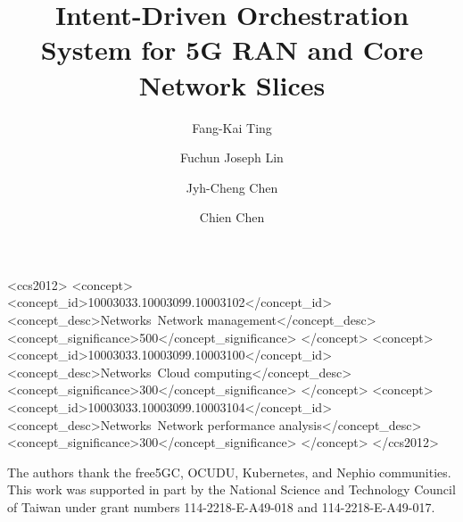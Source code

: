 ﻿\documentclass[sigconf]{acmart}
\begin{document}
\title[Intent-Driven Orchestration for 5G Slices]{Intent-Driven Orchestration System for 5G RAN and Core Network Slices}

\author{Fang-Kai Ting}

\author{Fuchun Joseph Lin}

\author{Jyh-Cheng Chen}

\author{Chien Chen}

\renewcommand{\shortauthors}{Ting and Chen}

\begin{abstract}

\end{abstract}

\begin{CCSXML}
<ccs2012>
 <concept>
  <concept_id>10003033.10003099.10003102</concept_id>
  <concept_desc>Networks~Network management</concept_desc>
  <concept_significance>500</concept_significance>
 </concept>
 <concept>
  <concept_id>10003033.10003099.10003100</concept_id>
  <concept_desc>Networks~Cloud computing</concept_desc>
  <concept_significance>300</concept_significance>
 </concept>
 <concept>
  <concept_id>10003033.10003099.10003104</concept_id>
  <concept_desc>Networks~Network performance analysis</concept_desc>
  <concept_significance>300</concept_significance>
 </concept>
</ccs2012>
\end{CCSXML}



\maketitle








\begin{acks}
The authors thank the free5GC, OCUDU, Kubernetes, and Nephio communities. This work was supported in part by the National Science and Technology Council of Taiwan under grant numbers 114-2218-E-A49-018 and 114-2218-E-A49-017.
\end{acks}

\renewcommand{\bibfont}{\scriptsize}
\setlength{\bibsep}{0pt}


\end{document}
